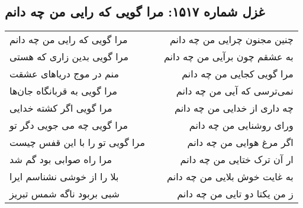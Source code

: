 \begin{center}
\section*{غزل شماره ۱۵۱۷: مرا گویی که رایی من چه دانم}
\label{sec:1517}
\begin{longtable}{l p{0.5cm} r}
مرا گویی که رایی من چه دانم
&&
چنین مجنون چرایی من چه دانم
\\
مرا گویی بدین زاری که هستی
&&
به عشقم چون برآیی من چه دانم
\\
منم در موج دریاهای عشقت
&&
مرا گویی کجایی من چه دانم
\\
مرا گویی به قربانگاه جان‌ها
&&
نمی‌ترسی که آیی من چه دانم
\\
مرا گویی اگر کشته خدایی
&&
چه داری از خدایی من چه دانم
\\
مرا گویی چه می جویی دگر تو
&&
ورای روشنایی من چه دانم
\\
مرا گویی تو را با این قفس چیست
&&
اگر مرغ هوایی من چه دانم
\\
مرا راه صوابی بود گم شد
&&
ار آن ترک ختایی من چه دانم
\\
بلا را از خوشی نشناسم ایرا
&&
به غایت خوش بلایی من چه دانم
\\
شبی بربود ناگه شمس تبریز
&&
ز من یکتا دو تایی من چه دانم
\\
\end{longtable}
\end{center}
